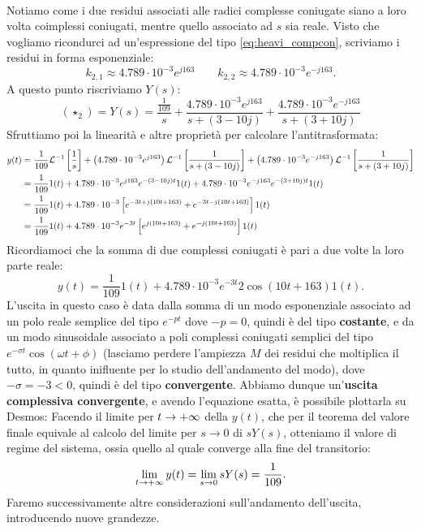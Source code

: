 \begin{esem}
\begin{align*}
\end{align*}
Notiamo come i due residui associati alle radici complesse coniugate siano a loro volta coimplessi coniugati, mentre quello associato ad $s$ sia reale.  Visto che vogliamo ricondurci ad un'espressione del tipo \eqref{eq:heavi_compcon}, scriviamo i residui in forma esponenziale:
\begin{equation*}
k_{2,1} \approx 4.789\cdot 10^{-3}e^{j163} \quad \quad k_{2,2} \approx 4.789 \cdot 10^{-3}e^{-j163}.
\end{equation*}
A questo punto riscriviamo $Y(s)$:
\begin{equation*}
(\star_2) = Y(s) = \frac{\frac{1}{109}}{s} + \frac{4.789\cdot 10^{-3}e^{j163}}{s+(3-10j)} +\frac{4.789\cdot 10^{-3}e^{-j163}}{s+(3+10j)}
\end{equation*}
Sfruttiamo poi la linearità e altre proprietà per calcolare l'antitrasformata:
\begin{align*}
y(t) &= \frac{1}{109} \mathcal{L}^{-1}\left[ \frac{1}{s} \right] + \left( 4.789\cdot 10^{-3}e^{j163} \right) \mathcal{L}^{-1}\left[ \frac{1}{s+(3-10j)} \right] + \left( 4.789\cdot 10^{-3}e^{-j163} \right)  \mathcal{L}^{-1}\left[ \frac{1}{s+(3+10j)} \right] \\ &= \frac{1}{109} 1(t) + 4.789\cdot 10^{-3}e^{j163}e^{-(3-10j)t}1(t) + 4.789\cdot 10^{-3}e^{-j163} e^{-(3+10j)t}1(t) \\ & = \frac{1}{109} 1(t) + 4.789\cdot 10^{-3} \left[ e^{-3t+j(10t+163)} + e^{-3t-j(10t+163)} \right]1(t) \\ & = \frac{1}{109} 1(t) + 4.789\cdot 10^{-3} e^{-3t}\left[ e^{j(10t+163)} + e^{-j(10t+163)} \right]1(t)
\end{align*}
\bb
Ricordiamoci che la somma di due complessi coniugati è pari a due volte la loro parte reale:
\begin{equation*}
y(t) = \frac{1}{109} 1(t) + 4.789\cdot 10^{-3} e^{-3t}2\cos(10t+163)1(t).
\end{equation*}
L'uscita in questo caso è data dalla somma di un modo esponenziale associato ad un polo reale semplice del tipo $e^{-pt}$ dove $-p = 0$, quindi è del tipo  \textbf{costante}, e da un modo sinusoidale associato a poli complessi coniugati semplici del tipo $e^{-\sigma t}\cos(\omega t + \phi)$ (lasciamo perdere l'ampiezza $M$ dei residui che moltiplica il tutto, in quanto inifluente per lo studio dell'andamento del modo), dove $-\sigma = -3 < 0$, quindi è del tipo \textbf{convergente}. Abbiamo dunque un'\textbf{uscita complessiva convergente}, e avendo l'equazione esatta, è possibile plottarla su Desmos:
\bb
Facendo il limite per $t \rightarrow +\infty$ della $y(t)$, che per il teorema del valore finale equivale al calcolo del limite per $s \rightarrow 0$ di $sY(s)$, otteniamo il valore di regime del sistema, ossia quello al quale converge alla fine del transitorio:
\begin{equation*}
\lim_{t \rightarrow +\infty} y(t) = \lim_{s \rightarrow 0} sY(s) = \frac{1}{109}.
\end{equation*}
Faremo successivamente altre considerazioni sull'andamento dell'uscita, introducendo nuove grandezze.
\end{esem}
